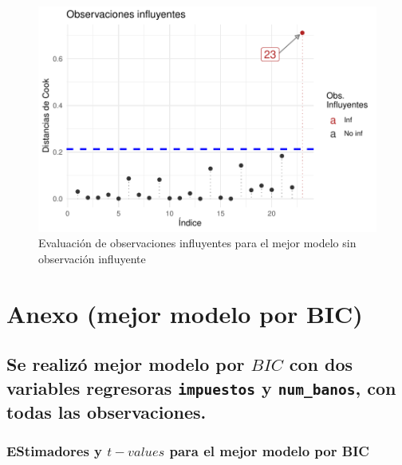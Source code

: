 \documentclass[
]{article}
\begin{document}
\begin{figure}
\centering
\includegraphics{diagnosticorrpp_files/figure-latex/observaciones influyentes para bestmodel sin 17-1.pdf}
\caption{Evaluación de observaciones influyentes para el mejor modelo
sin observación influyente}
\end{figure}

\hypertarget{anexo-mejor-modelo-por-bic}{%
\section{Anexo (mejor modelo por
BIC)}\label{anexo-mejor-modelo-por-bic}}

\hypertarget{se-realizuxf3-mejor-modelo-por-bic-con-dos-variables-regresoras-impuestos-y-num_banos-con-todas-las-observaciones.}{%
\subsection{\texorpdfstring{Se realizó mejor modelo por \(BIC\) con dos
variables regresoras \texttt{impuestos} y \texttt{num\_banos}, con todas
las
observaciones.}{Se realizó mejor modelo por BIC con dos variables regresoras impuestos y num\_banos, con todas las observaciones.}}\label{se-realizuxf3-mejor-modelo-por-bic-con-dos-variables-regresoras-impuestos-y-num_banos-con-todas-las-observaciones.}}

\hypertarget{estimadores-y-t-values-para-el-mejor-modelo-por-bic}{%
\subsubsection{\texorpdfstring{EStimadores y \(t-values\) para el mejor
modelo por
BIC}{EStimadores y t-values para el mejor modelo por BIC}}\label{estimadores-y-t-values-para-el-mejor-modelo-por-bic}}
\end{document}
